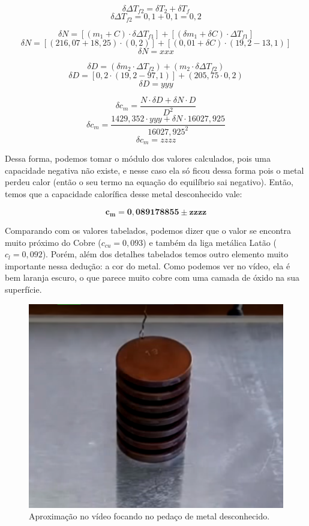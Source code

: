 \[ \delta \Delta T_{f2} = \delta T_2 + \delta T_f \]
\[ \delta \Delta T_{f2} = 0,1 + 0,1 = 0,2 \]

\[ \delta N = [(m_1 + C) \cdot \delta \Delta T_{f1}] + [(\delta m_1 + \delta C) \cdot \Delta T_{f1}] \]
\[ \delta N = [(216,07 + 18,25) \cdot (0,2)] + [(0,01 + \delta C) \cdot (19,2 - 13,1)] \]
\[ \delta N = xxx \]

\[ \delta D = (\delta m_2 \cdot \Delta T_{f2}) + (m_2 \cdot \delta \Delta T_{f2}) \]
\[ \delta D = [0,2 \cdot (19,2 - 97,1)] + (205,75 \cdot 0,2) \]
\[ \delta D = yyy \]

\[ \delta c_m = \frac{N \cdot \delta D + \delta N \cdot D}{D^2} \]
\[ \delta c_m = \frac{1429,352 \cdot yyy + \delta N \cdot 16027,925}{16027,925^2} \]
\[ \delta c_m = zzzz \]

Dessa forma, podemos tomar o módulo dos valores calculados, pois uma capacidade negativa não existe, e nesse caso ela só ficou dessa forma pois o metal perdeu calor (então o seu termo na equação do equilíbrio sai negativo). Então, temos que a capacidade calorífica desse metal desconhecido vale:

\[ \mathbf{c_m = 0,089178855 \pm zzzz } \]

Comparando com os valores tabelados, podemos dizer que o valor se encontra muito próximo do Cobre ($c_{cu} = 0,093$) e também da liga metálica Latão ($c_{l} = 0,092$). Porém, além dos detalhes tabelados temos outro elemento muito importante nessa dedução: a cor do metal. Como podemos ver no vídeo, ela é bem laranja escuro, o que parece muito cobre com uma camada de óxido na sua superfície.

\begin{figure}[H]
  \centering
  \includegraphics[scale=0.6]{images/metal.png}
  \caption{Aproximação no vídeo focando no pedaço de metal desconhecido.}
\end{figure}

